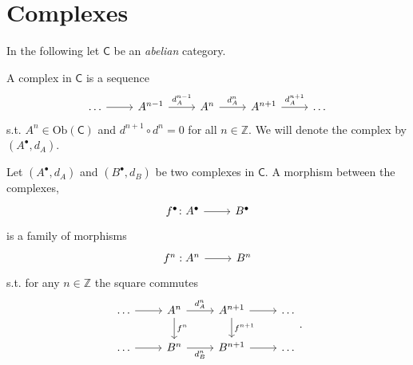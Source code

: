 \documentclass[../Main]{subfiles}
\begin{document}
\section{Complexes}
In the following let $\mathsf{C}$ be an {\em abelian} category.

\begin{defn}
	A complex in $\mathsf{C}$ is a sequence
	\begin{equation}
	\begin{tikzcd}
		\ldots \arrow[r, "", rightarrow] &
		A^{n-1} \arrow[r, "d_A^{n-1}", rightarrow] &
		A^n \arrow[r, "d_A^n", rightarrow] &
		A^{n+1} \arrow[r, "d_A^{n+1}", rightarrow] &
		\ldots
	\end{tikzcd}
	\end{equation} 
	s.t. $A^{n} \in \mathrm{Ob} \left(\mathsf{C}\right)$
	and $d^{n+1} \circ d^n = 0$ for all $n \in \mathbb{Z}$.
	We will denote the complex by $\left(A^\bullet, d_A\right)$.
\end{defn}

\begin{defn}
	Let $\left(A^\bullet, d_A\right)$ and $\left( B^{\bullet}, d_{B} \right)$
	be two complexes in $\mathsf{C}$.
	A morphism between the complexes,
	\begin{equation}
		\begin{tikzcd}
			f^\bullet\colon A^\bullet \arrow[r, "", rightarrow] &
			B^\bullet
		\end{tikzcd}
	\end{equation} 
	is a family of morphisms
	\begin{equation}
	\begin{tikzcd}
		f^n: A^n \arrow[r, "", rightarrow] &
		B^n
	\end{tikzcd}
	\end{equation} 
	s.t. for any $n \in \mathbb{Z}$ the square commutes
	\begin{equation}
	\begin{tikzcd}
		\ldots \arrow[r, "", rightarrow] &
		A^n \arrow[r, "d^n_A", rightarrow] \arrow[d, "f^n", rightarrow] &
		A^{n+1} \arrow[d, "f^{n+1}", rightarrow] \arrow[r, "", rightarrow] &
		\ldots\\
		\ldots \arrow[r, "", rightarrow] &
		B^n \arrow[r, "d^n_B"', rightarrow] &
		B^{n+1} \arrow[r, "", rightarrow] &
		\ldots
	\end{tikzcd}
	.\end{equation} 	
\end{defn}
\end{document}
